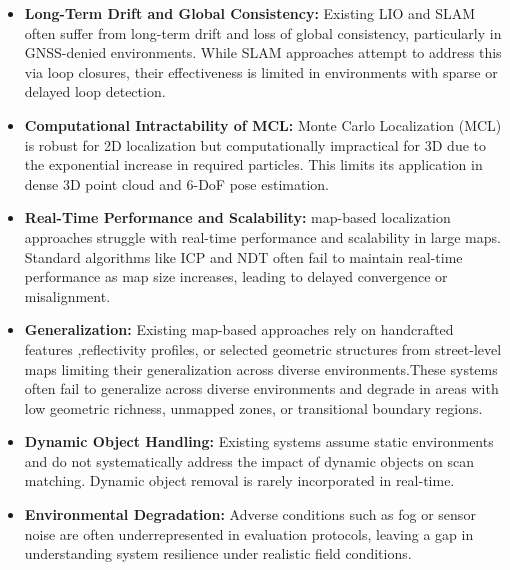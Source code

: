 \begin{itemize}
    \item \textbf{Long-Term Drift and Global Consistency:} Existing LIO and SLAM often suffer from long-term drift and loss of global consistency, particularly in GNSS-denied environments. While SLAM approaches attempt to address this via loop closures, their effectiveness is limited in environments with sparse or delayed loop detection.
    
    \item \textbf{Computational Intractability of MCL:} Monte Carlo Localization (MCL) is robust for 2D localization but computationally impractical for 3D due to the exponential increase in required particles. This limits its application in dense 3D point cloud and 6-DoF pose estimation.
    
    \item \textbf{Real-Time Performance and Scalability:}  map-based localization approaches struggle with real-time performance and scalability in large maps. Standard algorithms like ICP and NDT often fail to maintain real-time performance as map size increases, leading to delayed convergence or misalignment.
    
    \item \textbf{Generalization:} Existing  map-based approaches rely on handcrafted 
    features ,reflectivity profiles, or selected
    geometric structures from street-level maps limiting their generalization across diverse environments.These systems often fail to generalize across
    diverse environments and degrade in areas with low geometric richness, unmapped zones,
    or transitional boundary regions.
    
    \item \textbf{Dynamic Object Handling:} Existing systems assume static environments and do not systematically address the impact of dynamic objects on scan matching. Dynamic object removal is rarely incorporated in real-time.
    
    \item \textbf{Environmental Degradation:} Adverse conditions such as fog or sensor noise are often underrepresented in evaluation protocols, leaving a gap in understanding system resilience under realistic field conditions.
    
\end{itemize}
